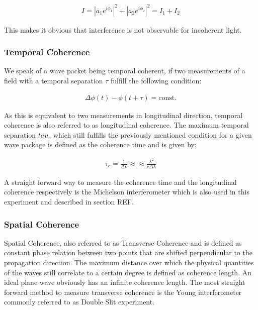 \begin{align}
I=\left| a_1 e^{i \phi_1} \right|^2+ \left| a_2 e^{i \phi_2}\right|^2 = I_1+I_2
\end{align}

This makes it obvious that interference is not observable for incoherent light.\cite{coherence}




\subsubsection{Temporal Coherence}
We speak of a wave packet being temporal coherent, if two measurements of a field with a temporal separation $\tau$ fulfill the following condition:

\begin{align}
\Delta \phi \left( t \right) - \phi\left( t + \tau\right)  = \text{const.}
\end{align}

As this is equivalent to two measurements in longitudinal direction, temporal coherence is also referred to as longitudinal coherence. The maximum temporal separation $tau_c$ which still fulfills the previously mentioned condition for a given wave package is defined as the coherence time and is given by:

\begin{align}
\tau_c = \frac{1}{\Delta \nu} \approx\approx \frac{\lambda^2}{c\Delta \lambda}
\end{align}

A straight forward way to measure the coherence time and the longitudinal coherence respectively is the Michelson interferometer which is also used in this experiment and described in section REF.
\subsubsection{Spatial Coherence}
Spatial Coherence, also referred to as Transverse Coherence and is defined as constant phase relation between two points that are shifted perpendicular to the propagation direction. The maximum distance over which the physical quantities of the waves still correlate to a certain degree is defined as coherence length. An ideal plane wave obviously has an infinite coherence length. The most straight forward method to measure transverse coherence is the Young interferometer commonly referred to as Double Slit experiment.

